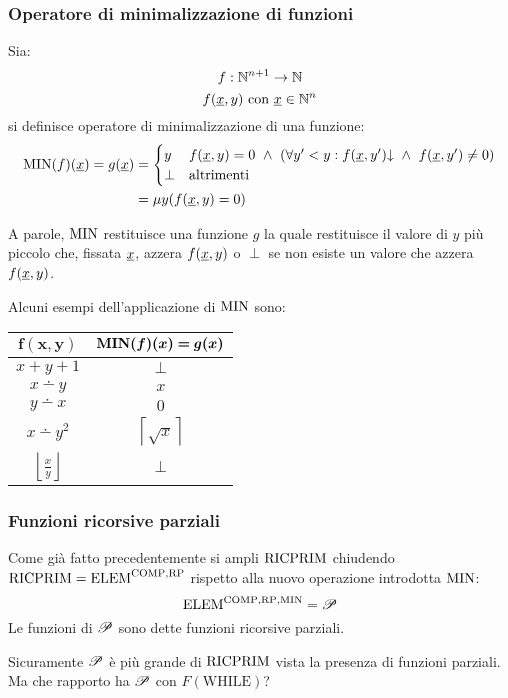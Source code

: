 \subsubsection*{Operatore di minimalizzazione di funzioni}
Sia:
$$ f:\mathbb{N}^{n+1}\to\mathbb{N} $$
$$ f(\text{\underline{$x$}},y)\text{ con }\text{\underline{$x$}}\in\mathbb{N}^n $$
si definisce operatore di minimalizzazione di una funzione:
$$ \begin{aligned}
    \MIN(f)(\sottolinea{x}) = g(\sottolinea{x}) &=
    \begin{cases}
    y & f(\sottolinea{x},y)=0\ \wedge \ (\forall y'<y:f(\sottolinea{x},y')\termina\ 
    \wedge \ f(\sottolinea{x},y')\neq0)\\
    \perp & \text{altrimenti}
    \end{cases}\\
    &= \mu y(f(\sottolinea{x},y)=0)
\end{aligned}$$

A parole, $\text{MIN}$ restituisce una funzione $g$ la quale restituisce il valore di $y$ più piccolo
che, fissata $\text{\underline{$x$}}$, azzera $f(\text{\underline{$x$}},y)$ o $\perp$ se non esiste un valore
che azzera $f(\text{\underline{$x$}},y)$.

Alcuni esempi dell'applicazione di $\text{MIN}$ sono:
\begin{center}
    \begin{tabular}{c|c}
        $\bm{f(x,y)}$ & $\bm{\textbf{\ensuremath{\text{MIN}}}(f)(x)=g(x)}$\\ \hline
        $x+y+1$ & $\perp$\\
        $x\dotminus y$ & $x$\\
        $y\dotminus x$ & $0$\\
        $x\dotminus y^2$ & $\left\lceil\sqrt{x}\right\rceil$\\
        $\left\lfloor\frac{x}{y}\right\rfloor$ & $\perp$\\
    \end{tabular}
\end{center}

\subsubsection{Funzioni ricorsive parziali}
Come già fatto precedentemente si ampli $\text{RICPRIM}$ chiudendo $\text{RICPRIM}=\text{ELEM}^{\text{COMP},\text{RP}}$
rispetto alla nuovo operazione introdotta $\text{MIN}$:
$$ \text{ELEM}^{\text{COMP},\text{RP},\text{MIN}} = \mathscr{P} $$
Le funzioni di $\mathscr{P}$ sono dette funzioni ricorsive parziali.

Sicuramente $\mathscr{P}$ è più grande di $\text{RICPRIM}$ vista la presenza di funzioni parziali. Ma che
rapporto ha $\mathscr{P}$ con $F(\text{WHILE})$?

